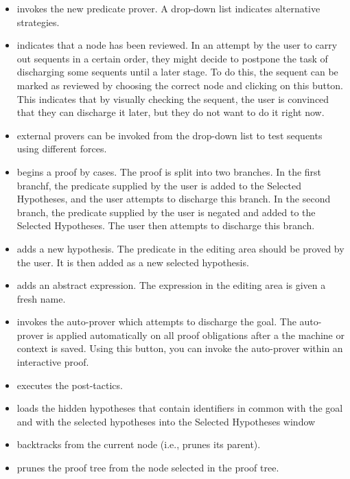 \begin{itemize}
    \item {} invokes the new predicate prover. A drop-down list indicates alternative strategies.
    \item {} indicates that a node has been reviewed. In an attempt by the user to carry out sequents in a certain order, they might decide to postpone the task of discharging some sequents until a later stage. To do this, the sequent can be marked as reviewed by choosing the correct node and clicking on this button. This indicates that by visually checking the sequent, the user is convinced that they can discharge it later, but they do not want to do it right now.
    \item {} external provers can be invoked from the drop-down list to test sequents using different forces.
    \item {} begins a proof by cases. The proof is split into two branches. In the first branchf, the predicate supplied by the user is added to the Selected Hypotheses, and the user attempts to discharge this branch. In the second branch, the predicate supplied by the user is negated and added to the Selected Hypotheses. The user then attempts to discharge this branch. 
    \item {} adds a new hypothesis. The predicate in the editing area should be proved by the user. It is then added as a new selected hypothesis.
    \item {} adds an abstract expression. The expression in the editing area is given a fresh name.
    \item {} invokes the auto-prover which attempts to discharge the goal. The auto-prover is applied automatically on all proof obligations after a the machine or context is saved. Using this button, you can invoke the auto-prover within an interactive proof.
    \item {} executes the post-tactics.
    \item {} loads the hidden hypotheses that contain identifiers in common with the goal and with the selected hypotheses into the Selected Hypotheses window 
    \item {} backtracks from the current node (i.e., prunes its parent).
    \item {} prunes the proof tree from the node selected in the proof tree.

\end{itemize}
